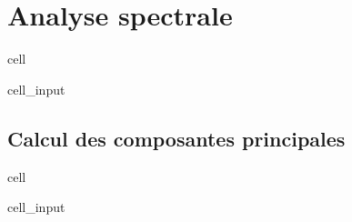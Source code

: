 \documentclass[letterpaper,10pt,english]{jupyterBook}
\begin{document}
\section{Analyse spectrale}
\label{\detokenize{acp:analyse-spectrale}}
\begin{sphinxuseclass}{cell}\begin{sphinxVerbatimInput}

\begin{sphinxuseclass}{cell_input}
\begin{sphinxVerbatim}[commandchars=\\\{\}]
  
   
  \PYG{p}{[}\PYG{p}{[}\PYG{p}{]}    \PYG{p}{]}
\end{sphinxVerbatim}

\end{sphinxuseclass}\end{sphinxVerbatimInput}

\end{sphinxuseclass}

\subsection{Calcul des composantes principales}
\label{\detokenize{acp:calcul-des-composantes-principales}}
\begin{sphinxuseclass}{cell}\begin{sphinxVerbatimInput}

\begin{sphinxuseclass}{cell_input}
\begin{sphinxVerbatim}[commandchars=\\\{\}]
  \PYG{p}{[}\PYG{p}{]}
   
      \PYG{p}{[}\PYG{p}{]}
\end{sphinxVerbatim}

\end{sphinxuseclass}\end{sphinxVerbatimInput}

\end{sphinxuseclass}
\end{document}
